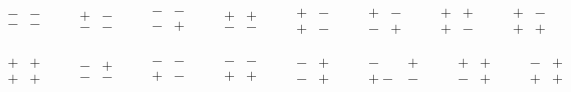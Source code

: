 \documentclass[%
oneside,                 %
final,                   %
10pt]{article}
\begin{document}
\begin{equation*}
\begin{split}
&\begin{smallmatrix} -&-\\ -&- \end{smallmatrix}
\qquad
\begin{smallmatrix} +&-\\ -&- \end{smallmatrix}
\qquad
\begin{smallmatrix} -&-\\ -&+ \end{smallmatrix}
\qquad
\begin{smallmatrix} +&+\\ -&- \end{smallmatrix}
\qquad
\begin{smallmatrix} +&-\\ +&- \end{smallmatrix}
\qquad
\begin{smallmatrix} +&-\\ -&+ \end{smallmatrix}
\qquad
\begin{smallmatrix} +&+\\ +&- \end{smallmatrix}
\qquad
\begin{smallmatrix} +&-\\ +&+ \end{smallmatrix} \\ 
\\
\\
&\begin{smallmatrix} +&+\\ +&+ \end{smallmatrix}
\qquad
\begin{smallmatrix} -&+\\ -&- \end{smallmatrix}
\qquad
\begin{smallmatrix} -&-\\ +&- \end{smallmatrix}
\qquad
\begin{smallmatrix} -&-\\ +&+ \end{smallmatrix}
\qquad
\begin{smallmatrix} -&+\\ -&+ \end{smallmatrix}
\qquad
\begin{smallmatrix} -&+\\+-&- \end{smallmatrix}
\qquad
\begin{smallmatrix} +&+\\ -&+ \end{smallmatrix}
\qquad
\begin{smallmatrix} -&+\\ +&+\end{smallmatrix} 
\end{split}
\end{equation*}
\end{document}
